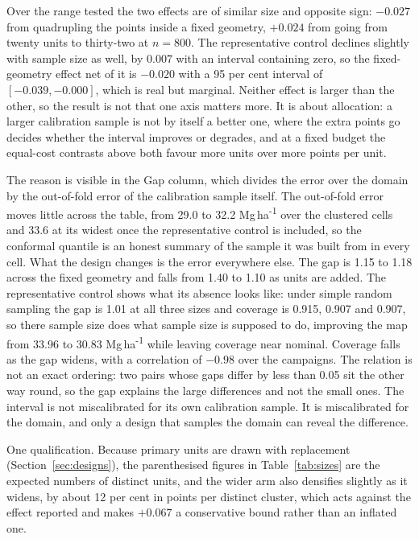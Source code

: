 \documentclass[preprint,12pt,authoryear]{elsarticle}
\newcommand{\Mgha}{Mg\,ha\textsuperscript{-1}}
\begin{document}
Over the range tested the two effects are of similar size and opposite sign: $-0.027$ from
quadrupling the points inside a fixed geometry, $+0.024$ from going from twenty
units to thirty-two at $n=800$. The representative control declines slightly
with sample size as well, by $0.007$ with an interval containing zero, so the
fixed-geometry effect net of it is $-0.020$ with a 95 per cent interval of
$[-0.039, -0.000]$, which is real but marginal. Neither effect is larger than
the other, so the result is not that one axis matters more. It is about
allocation: a larger calibration sample is not by itself a better one, where
the extra points go decides whether the interval improves or degrades, and at a
fixed budget the equal-cost contrasts above both favour more units over more
points per unit.

The reason is visible in the Gap column, which divides the error over the
domain by the out-of-fold error of the calibration sample itself. The
out-of-fold error moves little across the table, from 29.0 to 32.2 \Mgha{} over
the clustered cells and 33.6 at its widest once the representative control is
included, so the conformal quantile is an honest summary of the sample it was
built from in every cell. What the design changes is the error everywhere else.
The gap is 1.15 to 1.18 across the fixed
geometry and falls from 1.40 to 1.10 as units are added. The representative
control shows what its absence looks like: under simple random sampling the gap
is 1.01 at all three sizes and coverage is 0.915, 0.907 and 0.907, so there
sample size does what sample size is supposed to do, improving the map from
33.96 to 30.83 \Mgha{} while leaving coverage near nominal. Coverage falls as the
gap widens, with a correlation of $-0.98$ over the campaigns. The relation is
not an exact ordering: two pairs whose gaps differ by less than 0.05 sit the
other way round, so the gap explains the large differences and not the small
ones. The interval is not miscalibrated for its own calibration sample. It is
miscalibrated for the domain, and only a design that samples the domain can
reveal the difference.

One qualification. Because primary units are drawn with replacement
(Section~\ref{sec:designs}), the parenthesised figures in Table~\ref{tab:sizes}
are the expected numbers of distinct units, and the wider arm also densifies
slightly as it widens, by about 12 per cent in
points per distinct cluster, which acts against the effect reported and makes
$+0.067$ a conservative bound rather than an inflated one.
\end{document}
